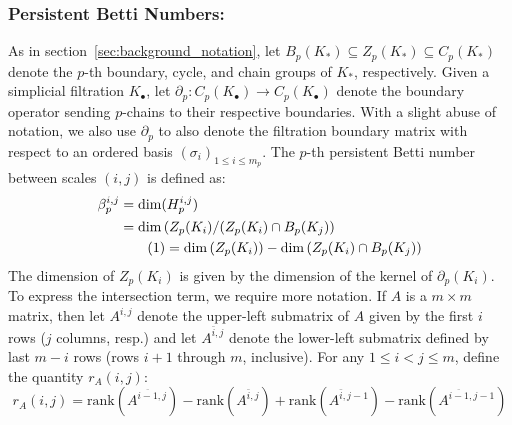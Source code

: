 \documentclass[10pt]{article}
\newcommand\numberthis{\addtocounter{equation}{1}\tag{\theequation}}
\begin{document}
\subsubsection*{Persistent Betti Numbers:} 
As in section~\ref{sec:background_notation}, let $B_p(K_\ast) \subseteq Z_p(K_\ast) \subseteq C_p(K_\ast)$ denote the $p$-th boundary, cycle, and chain groups of $K_\ast$, respectively. 
Given a simplicial filtration $K_{\bullet}$, let $\partial_p : C_p( K_{\bullet}) \to C_p(K_{\bullet})$ denote the boundary operator sending $p$-chains to their respective boundaries. 
With a slight abuse of notation, we also use $\partial_p$ to also denote the filtration boundary matrix with respect to an ordered basis $(\sigma_i)_{1 \leq i \leq m_p}$.  
The $p$-th persistent Betti number between scales $(i,j)$ is defined as: 
\begin{align*} %
	\beta_p^{i,j} &= \mathrm{dim}(H_p^{i,j}) \\
	&= \mathrm{dim} \left( Z_p(K_i) / (Z_p(K_i) \cap B_p(K_j) \right) \\
	& \numberthis = \mathrm{dim} \left( Z_p(K_i) \right) - \mathrm{dim}\left( Z_p(K_i) \cap B_p(K_j) \right ) \label{eq:pb2}
\end{align*}
The dimension of $Z_p(K_i)$ is given by the dimension of the kernel of $\partial_p(K_i)$.
To express the intersection term, we require more notation. If $A$ is a $m \times m$ matrix, then let $A^{i,j}$ denote the upper-left submatrix of $A$ given by the first $i$ rows ($j$ columns, resp.) and let $A^{\bar{i}, j}$ denote the lower-left submatrix defined by last $m - i$ rows (rows $i+1$ through $m$, inclusive). For any $1 \leq i < j \leq m$, define the quantity $r_A(i,j)$:
\begin{equation}
	r_A(i,j) = \mathrm{rank}(A^{\overline{i-1}, j}) - \mathrm{rank}(A^{\bar{i}, j}) + \mathrm{rank}(A^{\bar{i}, j-1}) - \mathrm{rank}(A^{\overline{i-1}, j-1})
\end{equation}
\end{document}
